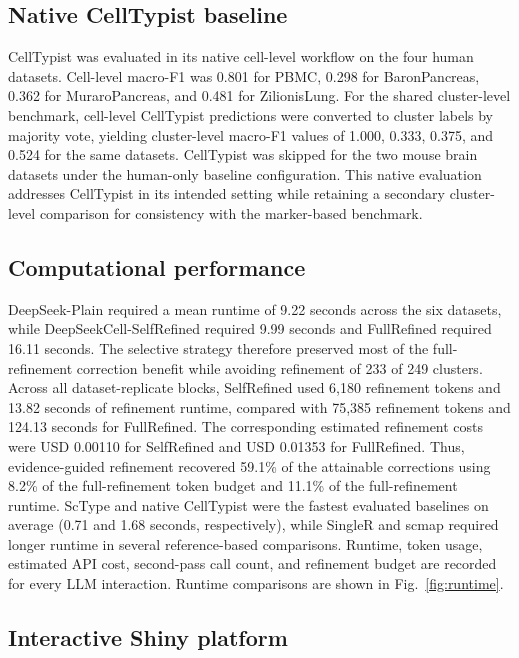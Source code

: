 \documentclass[referee,lineno,pdflatex]{sn-jnl}
\begin{document}
\subsection{Native CellTypist baseline}

CellTypist was evaluated in its native cell-level workflow on the four human datasets. Cell-level macro-F1 was 0.801 for PBMC, 0.298 for BaronPancreas, 0.362 for MuraroPancreas, and 0.481 for ZilionisLung. For the shared cluster-level benchmark, cell-level CellTypist predictions were converted to cluster labels by majority vote, yielding cluster-level macro-F1 values of 1.000, 0.333, 0.375, and 0.524 for the same datasets. CellTypist was skipped for the two mouse brain datasets under the human-only baseline configuration. This native evaluation addresses CellTypist in its intended setting while retaining a secondary cluster-level comparison for consistency with the marker-based benchmark.

\subsection{Computational performance}

DeepSeek-Plain required a mean runtime of 9.22 seconds across the six datasets, while DeepSeekCell-SelfRefined required 9.99 seconds and FullRefined required 16.11 seconds. The selective strategy therefore preserved most of the full-refinement correction benefit while avoiding refinement of 233 of 249 clusters. Across all dataset-replicate blocks, SelfRefined used 6,180 refinement tokens and 13.82 seconds of refinement runtime, compared with 75,385 refinement tokens and 124.13 seconds for FullRefined. The corresponding estimated refinement costs were USD 0.00110 for SelfRefined and USD 0.01353 for FullRefined. Thus, evidence-guided refinement recovered 59.1\% of the attainable corrections using 8.2\% of the full-refinement token budget and 11.1\% of the full-refinement runtime. ScType and native CellTypist were the fastest evaluated baselines on average (0.71 and 1.68 seconds, respectively), while SingleR and scmap required longer runtime in several reference-based comparisons. Runtime, token usage, estimated API cost, second-pass call count, and refinement budget are recorded for every LLM interaction. Runtime comparisons are shown in Fig.~\ref{fig:runtime}.

\subsection{Interactive Shiny platform}
\end{document}
